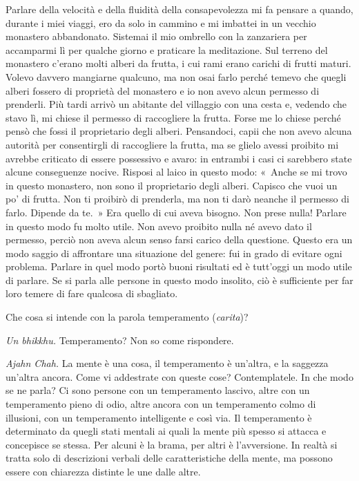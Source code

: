 Parlare della velocità e della fluidità della consapevolezza mi fa
pensare a quando, durante i miei viaggi, ero da solo in cammino e mi
imbattei in un vecchio monastero abbandonato. Sistemai il mio ombrello
con la zanzariera per accamparmi lì per qualche giorno e praticare la
meditazione. Sul terreno del monastero c'erano molti alberi da frutta, i
cui rami erano carichi di frutti maturi. Volevo davvero mangiarne
qualcuno, ma non osai farlo perché temevo che quegli alberi fossero di
proprietà del monastero e io non avevo alcun permesso di prenderli. Più
tardi arrivò un abitante del villaggio con una cesta e, vedendo che
stavo lì, mi chiese il permesso di raccogliere la frutta. Forse me lo
chiese perché pensò che fossi il proprietario degli alberi. Pensandoci,
capii che non avevo alcuna autorità per consentirgli di raccogliere la
frutta, ma se glielo avessi proibito mi avrebbe criticato di essere
possessivo e avaro: in entrambi i casi ci sarebbero state alcune
conseguenze nocive. Risposi al laico in questo modo: «~Anche se mi trovo
in questo monastero, non sono il proprietario degli alberi. Capisco che
vuoi un po' di frutta. Non ti proibirò di prenderla, ma non ti darò
neanche il permesso di farlo. Dipende da te.~» Era quello di cui aveva
bisogno. Non prese nulla! Parlare in questo modo fu molto utile. Non
avevo proibito nulla né avevo dato il permesso, perciò non aveva alcun
senso farsi carico della questione. Questo era un modo saggio di
affrontare una situazione del genere: fui in grado di evitare ogni
problema. Parlare in quel modo portò buoni risultati ed è tutt'oggi un
modo utile di parlare. Se si parla alle persone in questo modo insolito,
ciò è sufficiente per far loro temere di fare qualcosa di sbagliato.

Che cosa si intende con la parola temperamento (\emph{carita})?

\emph{Un bhikkhu.} Temperamento? Non so come rispondere.

\emph{Ajahn Chah.} La mente è una cosa, il temperamento è un'altra, e la
saggezza un'altra ancora. Come vi addestrate con queste cose?
Contemplatele. In che modo se ne parla? Ci sono persone con un
temperamento lascivo, altre con un temperamento pieno di odio, altre
ancora con un temperamento colmo di illusioni, con un temperamento
intelligente e così via. Il temperamento è determinato da quegli stati
mentali ai quali la mente più spesso si attacca e concepisce se stessa.
Per alcuni è la brama, per altri è l'avversione. In realtà si tratta
solo di descrizioni verbali delle caratteristiche della mente, ma
possono essere con chiarezza distinte le une dalle altre.

